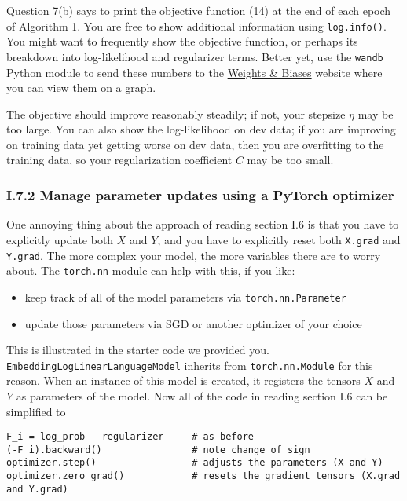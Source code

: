 \documentclass[12pt]{article}
\theoremstyle{plain}
\theoremstyle{definition}
\theoremstyle{remark}
\begin{document}
Question 7(b) says to print the objective function (14) at the end of each epoch of Algorithm 1. You are free to show additional information using \texttt{log.info()}. You might want to frequently show the objective function, or perhaps its breakdown into log-likelihood and regularizer terms. Better yet, use the \texttt{wandb} Python module to send these numbers to the \href{https://wandb.ai}{Weights \& Biases} website where you can view them on a graph.

The objective should improve reasonably steadily; if not, your stepsize $\eta$ may be too large. You can also show the log-likelihood on dev data; if you are improving on training data yet getting worse on dev data, then you are overfitting to the training data, so your regularization coefficient $C$ may be too small.

\subsubsection*{I.7.2 Manage parameter updates using a PyTorch optimizer}

One annoying thing about the approach of reading section I.6 is that you have to explicitly update both $X$ and $Y$, and you have to explicitly reset both \texttt{X.grad} and \texttt{Y.grad}. The more complex your model, the more variables there are to worry about. The \texttt{torch.nn} module can help with this, if you like:

\begin{itemize}
  \item keep track of all of the model parameters via \texttt{torch.nn.Parameter}
  \item update those parameters via SGD or another optimizer of your choice
\end{itemize}

This is illustrated in the starter code we provided you. \texttt{EmbeddingLogLinearLanguageModel} inherits from \texttt{torch.nn.Module} for this reason. When an instance of this model is created, it registers the tensors $X$ and $Y$ as parameters of the model. Now all of the code in reading section I.6 can be simplified to

\begin{verbatim}
F_i = log_prob - regularizer     # as before
(-F_i).backward()                # note change of sign
optimizer.step()                 # adjusts the parameters (X and Y)
optimizer.zero_grad()            # resets the gradient tensors (X.grad and Y.grad)
\end{verbatim}
\end{document}
